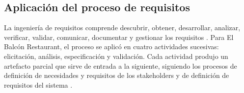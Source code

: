 \subsection{Aplicación del proceso de requisitos}
La ingeniería de requisitos comprende descubrir, obtener, desarrollar, analizar, verificar, validar, comunicar, documentar y gestionar los requisitos \cite[\nopp cl.~3.1.21]{ieee29148}. Para El Balcón Restaurant, el proceso se aplicó en cuatro actividades sucesivas: elicitación, análisis, especificación y validación. Cada actividad produjo un artefacto parcial que sirve de entrada a la siguiente, siguiendo los procesos de definición de necesidades y requisitos de los stakeholders \cite[\nopp cl.~6.3]{ieee29148} y de definición de requisitos del sistema \cite[\nopp cl.~6.4]{ieee29148}.

